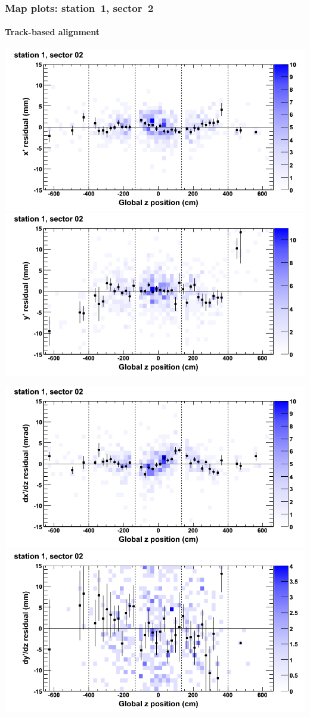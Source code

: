 \documentclass[compress]{beamer}
\begin{document}
\begin{frame}
\frametitle{Map plots: station~1, sector~2}
\framesubtitle{Track-based alignment}
\includegraphics[width=0.5\linewidth]{mapplots_re05/DTvsz_st1sec02_x.png}
\includegraphics[width=0.5\linewidth]{mapplots_re05/DTvsz_st1sec02_y.png}

\includegraphics[width=0.5\linewidth]{mapplots_re05/DTvsz_st1sec02_dxdz.png}
\includegraphics[width=0.5\linewidth]{mapplots_re05/DTvsz_st1sec02_dydz.png}
\end{frame}
\end{document}
